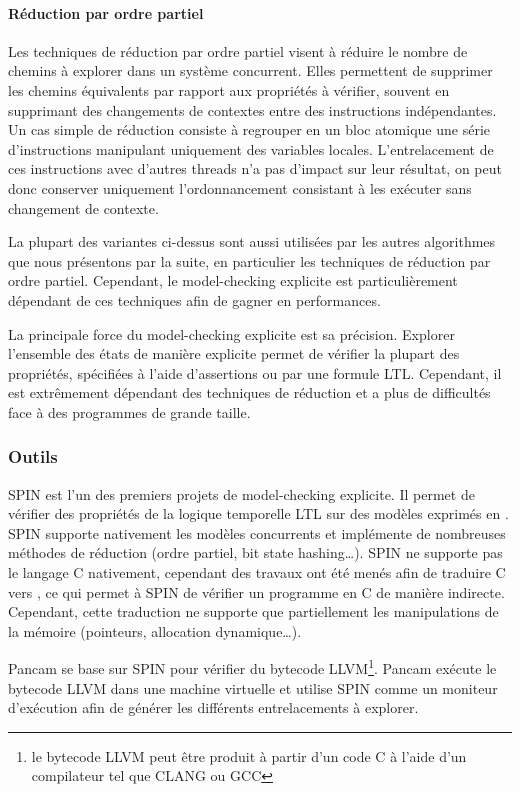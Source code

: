 \paragraph{Réduction par ordre partiel}
Les techniques de réduction par ordre partiel visent à réduire le nombre de
chemins à explorer dans un système concurrent. Elles permettent de supprimer les
chemins équivalents par rapport aux propriétés à vérifier, souvent en supprimant
des changements de contextes entre des instructions indépendantes. Un cas simple
de réduction consiste à regrouper en un bloc atomique une série d'instructions
manipulant uniquement des variables locales. L'entrelacement de ces instructions
avec d'autres threads n'a pas d'impact sur leur résultat, on peut donc conserver
uniquement l'ordonnancement consistant à les exécuter sans changement de
contexte.

La plupart des variantes ci-dessus sont aussi utilisées par les autres
algorithmes que nous présentons par la suite, en particulier les
techniques de réduction par ordre partiel. Cependant, le model-checking
explicite est particulièrement dépendant de ces techniques afin de
gagner en performances.

La principale force du model-checking explicite est sa précision. Explorer
l'ensemble des états de manière explicite permet de vérifier la plupart des
propriétés, spécifiées à l'aide d'assertions ou par une formule \ac{LTL}. Cependant,
il est extrêmement dépendant des techniques de réduction et a plus de
difficultés face à des programmes de grande taille.

\subsubsection{Outils}

SPIN\cite{SPIN} est l'un des premiers projets de model-checking
explicite. Il permet de vérifier des propriétés de la logique temporelle
\ac{LTL} sur des modèles exprimés en . SPIN supporte nativement
les modèles concurrents et implémente de nombreuses méthodes de réduction
(ordre partiel, bit state hashing\dots). SPIN ne supporte pas le langage
C nativement, cependant des travaux ont été menés afin de traduire C
vers \cite{jiang_C_to_Promela}, ce qui permet à SPIN de
vérifier un programme en C de manière indirecte. Cependant, cette traduction
ne supporte que partiellement les manipulations de la mémoire (pointeurs,
allocation dynamique\dots).

Pancam\cite{Pancam} se base sur SPIN pour vérifier du bytecode
LLVM\footnote{le bytecode LLVM peut être produit à partir d'un code C à
  l'aide d'un compilateur tel que CLANG ou GCC}. Pancam exécute le
bytecode LLVM dans une machine virtuelle et utilise SPIN comme un
moniteur d'exécution afin de générer les différents entrelacements à
explorer.

